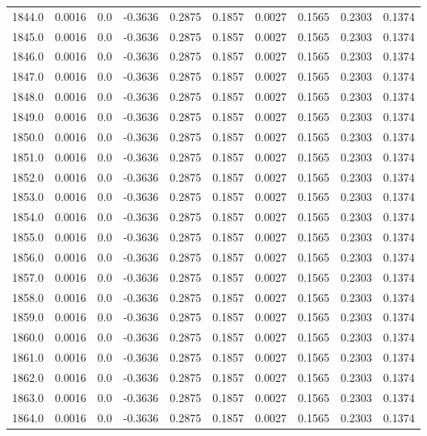 \begin{longtable}{lrrrrrrrrr}
1844.0 & 0.0016 & 0.0 & -0.3636 & 0.2875 & 0.1857 & 0.0027 & 0.1565 & 0.2303 & 0.1374 \\
1845.0 & 0.0016 & 0.0 & -0.3636 & 0.2875 & 0.1857 & 0.0027 & 0.1565 & 0.2303 & 0.1374 \\
1846.0 & 0.0016 & 0.0 & -0.3636 & 0.2875 & 0.1857 & 0.0027 & 0.1565 & 0.2303 & 0.1374 \\
1847.0 & 0.0016 & 0.0 & -0.3636 & 0.2875 & 0.1857 & 0.0027 & 0.1565 & 0.2303 & 0.1374 \\
1848.0 & 0.0016 & 0.0 & -0.3636 & 0.2875 & 0.1857 & 0.0027 & 0.1565 & 0.2303 & 0.1374 \\
1849.0 & 0.0016 & 0.0 & -0.3636 & 0.2875 & 0.1857 & 0.0027 & 0.1565 & 0.2303 & 0.1374 \\
1850.0 & 0.0016 & 0.0 & -0.3636 & 0.2875 & 0.1857 & 0.0027 & 0.1565 & 0.2303 & 0.1374 \\
1851.0 & 0.0016 & 0.0 & -0.3636 & 0.2875 & 0.1857 & 0.0027 & 0.1565 & 0.2303 & 0.1374 \\
1852.0 & 0.0016 & 0.0 & -0.3636 & 0.2875 & 0.1857 & 0.0027 & 0.1565 & 0.2303 & 0.1374 \\
1853.0 & 0.0016 & 0.0 & -0.3636 & 0.2875 & 0.1857 & 0.0027 & 0.1565 & 0.2303 & 0.1374 \\
1854.0 & 0.0016 & 0.0 & -0.3636 & 0.2875 & 0.1857 & 0.0027 & 0.1565 & 0.2303 & 0.1374 \\
1855.0 & 0.0016 & 0.0 & -0.3636 & 0.2875 & 0.1857 & 0.0027 & 0.1565 & 0.2303 & 0.1374 \\
1856.0 & 0.0016 & 0.0 & -0.3636 & 0.2875 & 0.1857 & 0.0027 & 0.1565 & 0.2303 & 0.1374 \\
1857.0 & 0.0016 & 0.0 & -0.3636 & 0.2875 & 0.1857 & 0.0027 & 0.1565 & 0.2303 & 0.1374 \\
1858.0 & 0.0016 & 0.0 & -0.3636 & 0.2875 & 0.1857 & 0.0027 & 0.1565 & 0.2303 & 0.1374 \\
1859.0 & 0.0016 & 0.0 & -0.3636 & 0.2875 & 0.1857 & 0.0027 & 0.1565 & 0.2303 & 0.1374 \\
1860.0 & 0.0016 & 0.0 & -0.3636 & 0.2875 & 0.1857 & 0.0027 & 0.1565 & 0.2303 & 0.1374 \\
1861.0 & 0.0016 & 0.0 & -0.3636 & 0.2875 & 0.1857 & 0.0027 & 0.1565 & 0.2303 & 0.1374 \\
1862.0 & 0.0016 & 0.0 & -0.3636 & 0.2875 & 0.1857 & 0.0027 & 0.1565 & 0.2303 & 0.1374 \\
1863.0 & 0.0016 & 0.0 & -0.3636 & 0.2875 & 0.1857 & 0.0027 & 0.1565 & 0.2303 & 0.1374 \\
1864.0 & 0.0016 & 0.0 & -0.3636 & 0.2875 & 0.1857 & 0.0027 & 0.1565 & 0.2303 & 0.1374 \\

\end{longtable}
